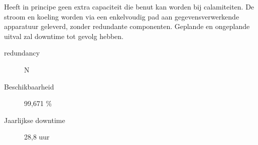 Heeft in principe geen extra capaciteit die benut kan worden bij calamiteiten. De stroom en koeling worden via een enkelvoudig pad aan gegevensverwerkende apparatuur geleverd, zonder redundante componenten. Geplande en ongeplande uitval zal downtime tot gevolg hebben.
\begin{description}
\item[redundancy] N
\item[Beschikbaarheid] 99,671 \%
\item[Jaarlijkse downtime] 28,8 uur
\end{description}
